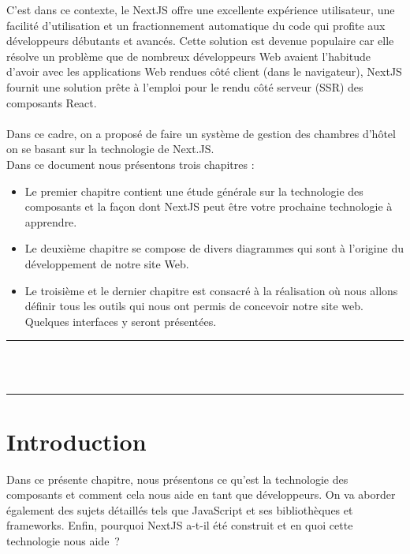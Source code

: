 \documentclass[12pt]{report}
\begin{document}
C’est dans ce contexte, le NextJS offre une excellente expérience utilisateur, une facilité d’utilisation et un fractionnement automatique du code qui profite aux développeurs débutants et avancés. Cette solution est devenue populaire car elle résolve un problème que de nombreux développeurs Web avaient l’habitude d’avoir avec les applications Web rendues côté client (dans le navigateur), NextJS fournit une solution prête à l’emploi pour le rendu côté serveur (SSR) des composants React.
\\\\
\hspace*{0.16in}
Dans ce cadre, on a proposé de faire un système de gestion des chambres d’hôtel on se basant sur la technologie de Next.JS.
\\
Dans ce document nous présentons trois chapitres :

\begin{itemize}
    \item Le premier chapitre contient une étude générale sur la technologie des composants et la façon dont NextJS peut être votre prochaine technologie à apprendre.
    \item Le deuxième chapitre se compose de divers diagrammes qui sont à l’origine du développement de notre site Web.
    \item Le troisième et le dernier chapitre est consacré à la réalisation où nous allons définir tous les outils qui nous ont permis de concevoir notre site web. Quelques interfaces y seront présentées.
\end{itemize}

\newpage

\vspace*{\fill}
\begin{center}
    {\color{Blue} \rule{\linewidth}{1.2mm} }\\
\vspace{0.25in}
 {\centering{}}
\vspace{0.35in}\\
    {\color{Blue} \rule{\linewidth}{1.2mm} }
\end{center}
\vspace*{\fill}
\setcounter{section}{0}

\newpage

\section{Introduction}
\vspace{0.2in}
\hspace*{0.16in}
Dans ce présente chapitre, nous présentons ce qu’est la technologie des composants et comment cela nous aide en tant que développeurs. On va aborder également des sujets détaillés tels que JavaScript et ses bibliothèques et frameworks. Enfin, pourquoi NextJS a-t-il été construit et en quoi cette technologie nous aide ?
\end{document}
